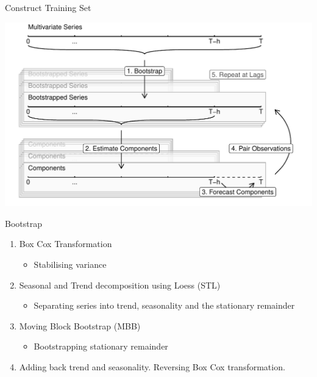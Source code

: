 \documentclass[14pt,ignorenonframetext,]{beamer}
\providecommand{\tightlist}{%
  \setlength{\itemsep}{0pt}\setlength{\parskip}{0pt}}
\begin{document}
\begin{frame}{Construct Training Set}
\protect\hypertarget{construct-training-set}{}
\begin{center}
\includegraphics[width=\linewidth]{plot/p_backtransform}
\end{center}
\end{frame}

\begin{frame}{Bootstrap}
\protect\hypertarget{bootstrap}{}
\begin{block}{\citet{Bergmeir2016-yx}}
\protect\hypertarget{bergmeir2016-yx}{}
\begin{enumerate}
\tightlist
\item
  Box Cox Transformation

  \begin{itemize}
  \tightlist
  \item
    Stabilising variance
  \end{itemize}
\item
  Seasonal and Trend decomposition using Loess (STL)

  \begin{itemize}
  \tightlist
  \item
    Separating series into trend, seasonality and the stationary
    remainder
  \end{itemize}
\item
  Moving Block Bootstrap (MBB)

  \begin{itemize}
  \tightlist
  \item
    Bootstrapping stationary remainder
  \end{itemize}
\item
  Adding back trend and seasonality. Reversing Box Cox transformation.
\end{enumerate}
\end{block}
\end{frame}
\end{document}
